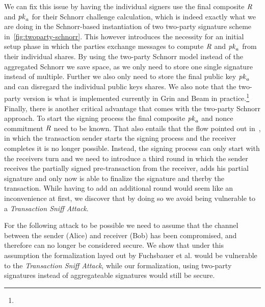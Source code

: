 We can fix this issue by having the individual signers use the final composite $\mathit{R}$ and $\mathit{pk}_a$ for their Schnorr challenge calculation, which is indeed exactly what we are doing in the Schnorr-based instantiation of two two-party signature scheme in~\cref{fig:twoparty-schnorr}.
This however introduces the necessity for an initial setup phase in which the parties exchange messages to compute $\mathit{R}$ and $\mathit{pk}_a$ from their individual shares.
By using the two-party Schnorr model instead of the aggregated Schnorr we save space, as we only need to store one single signature instead of multiple.
Further we also only need to store the final public key $\mathit{pk}_a$ and can disregard the individual public keys shares.
We also note that the two-party version is what is implemented currently in Grin and Beam in practice.\footnote{\urlgrinexplained}
Finally, there is another critical advantage that comes with the two-party Schnorr approach.
To start the signing process the final composite $\mathit{pk}_a$ and nonce commitment $\mathit{R}$ need to be known.
That also entails that the flow pointed out in~\cite{fuchsbauer2019aggregate}, in which the transaction sender starts the signing process and the receiver completes it is no longer possible.
Instead, the signing process can only start with the receivers turn and we need to introduce a third round in which the sender receives the partially signed pre-transaction from the receiver, adds his partial signature and only now is able to finalize the signature and therby the transaction.
While having to add an additional round would seem like an inconvenience at first, we discover that by doing so we avoid being vulnerable to a \emph{Transaction Sniff Attack}.

For the following attack to be possible we need to assume that the channel between the sender (Alice) and receiver (Bob) has been compromised, and therefore can no longer be considered secure.
We show that under this assumption the formalization layed out by Fuchsbauer et al. would be vulnerable to the \emph{Transaction Sniff Attack}, while our formalization, using two-party signatures instead of aggregateable signatures would still be secure.
